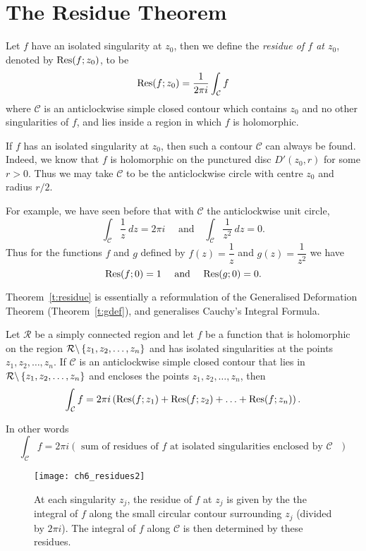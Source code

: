 \section{The Residue Theorem}

\begin{definition}
Let $f$ have an isolated singularity at $z_0$, then we define the \emph{residue of $f$ at $z_0$}, denoted by $\mathrm{Res} (f;z_0)$, to be
\[
\mathrm{Res} (f;z_0) = \frac{1}{2\pi i} \int_{\mathcal{C}} f
\]
where $\mathcal{C}$ is an anticlockwise simple closed contour which contains $z_0$ and no other singularities of $f$, and lies inside a region in which $f$ is holomorphic.
\end{definition}
If $f$ has an isolated singularity at $z_0$, then such a contour $\mathcal{C}$ can always be found.  Indeed, we know that $f$ is holomorphic on the punctured disc $D'(z_0,r)$ for some $r>0$.  Thus we may take $\mathcal{C}$ to be the anticlockwise circle with centre $z_0$ and radius $r/2$.


For example, we have seen before that with $\mathcal{C}$ the anticlockwise unit circle,
\[
\int_{\mathcal{C}} \frac{1}{z}\ dz=2\pi i \quad \text{ and} \quad \int_{\mathcal{C}} \frac{1}{z^2}\ dz = 0.
\]
Thus for the functions $f$ and $g$ defined by $f(z)=\dfrac{1}{z}$ and $g(z) = \dfrac{1}{z^2}$ we have
\[
\mathrm{Res} (f;0)=1 \quad \text{ and } \quad \mathrm{Res} (g;0) = 0.
\]


Theorem~\ref{t:residue} is essentially a reformulation of the Generalised Deformation Theorem (Theorem~\ref{t:gdef}), and generalises Cauchy's Integral Formula.
\begin{theorem}
\label{t:residue}
Let $\mathcal{R}$ be a simply connected region and let $f$ be a function that is holomorphic on the region $\mathcal{R} \backslash \left\{ z_1,z_2,\ldots , z_n\right\}$ and has isolated singularities at the points $z_1,z_2,\ldots,z_n$. If $\mathcal{C}$ is an anticlockwise simple closed contour that lies in $\mathcal{R}\backslash \left\{z_1,z_2,\ldots,z_n\right\}$ and encloses the points $z_1,z_2,\ldots,z_n$, then
\[
\int_{\mathcal{C}} f = 2 \pi i \left( \mathrm{Res} (f;z_1)+\mathrm{Res} (f;z_2) + \ldots + \mathrm{Res} (f;z_n ) \right).
\]
\end{theorem}
In other words
\[
\int_{\mathcal{C}} f = 2\pi i \left( \text{ sum of residues of $f$ at isolated singularities enclosed by $\mathcal{C}$ } \right)
\]

\begin{figure}[H]
\centering
\texttt{[image: ch6\_residues2]}
\caption{At each singularity $z_j$, the residue of $f$ at $z_j$ is given by the the integral of $f$ along the small circular contour surrounding $z_j$ (divided by $2\pi i$).  The integral of $f$ along $\mathcal{C}$ is then determined by these residues.}
\end{figure}

